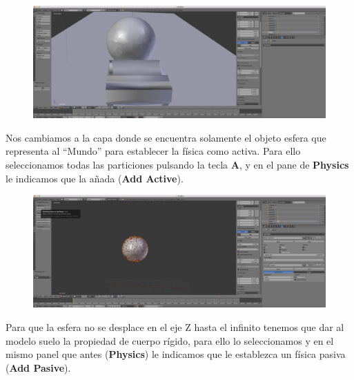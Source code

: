 \documentclass[10pt]{article}
\begin{document}
\begin{figure}[H]
	\begin{center}
	 		\includegraphics[width = 1.00\textwidth]{Imagenes/p5-img9}
	\end{center} 
\end{figure}

Nos cambiamos a la capa donde se encuentra solamente el objeto esfera que representa al ``Mundo'' para establecer la física como activa. Para ello seleccionamos todas las particiones pulsando la tecla \textbf{A}, y en el pane de \textbf{Physics} le indicamos que la añada (\textbf{Add Active}). \\

\begin{figure}[H]
	\begin{center}
	 		\includegraphics[width = 1.00\textwidth]{Imagenes/p5-img10}
	\end{center} 
\end{figure}

Para que la esfera no se desplace en el eje Z hasta el infinito tenemos que dar al modelo suelo la propiedad de cuerpo rígido, para ello lo seleccionamos y en el mismo panel que antes (\textbf{Physics}) le indicamos que le establezca un física pasiva (\textbf{Add Pasive}).\\
\end{document}
